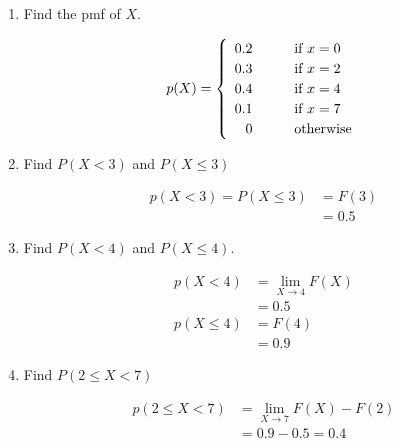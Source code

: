     \begin{enumerate}[label=(\alph*)]
        \item Find the pmf of $X$.
        \\
        \begin{mdframed}
            \begin{equation*}
                p(X) = \left\{
                    {\def\arraystretch{1.2}
                    \begin{array}{rll}
                    0.2 & \quad & \text{if } x = 0  \\
                    0.3 & \quad & \text{if } x = 2  \\
                    0.4 & \quad & \text{if } x = 4  \\
                    0.1 & \quad & \text{if } x = 7  \\
                    0   &       & \text{otherwise}
                \end{array}}
                \right.
            \end{equation*}
        \end{mdframed}

        \item Find $P(X < 3)$ and $P(X \leq 3)$
        \\
        \begin{mdframed}
            \begin{align*}
                p(X < 3) = P(X \leq 3)  & = F(3)        \\
                                        & = \boxed{0.5}
            \end{align*}
        \end{mdframed}

        \item Find $P(X < 4)$ and $P(X \leq 4)$.
        \\
        \begin{mdframed}
            \begin{align*}
                p(X < 4)    & = \lim_{X\rightarrow 4}F(X)       \\
                            & = \boxed{0.5}                     \\
                p(X \leq 4) & = F(4)                            \\
                            & = \boxed{0.9}
            \end{align*}
        \end{mdframed}

        \item Find $P(2 \leq X < 7)$
        \\
        \begin{mdframed}
            \begin{align*}
                p(2 \leq X < 7) & = \lim_{X\rightarrow 7}F(X) - F(2)    \\
                                & = 0.9 - 0.5 = \boxed{0.4}
            \end{align*}
        \end{mdframed}
    \end{enumerate}

